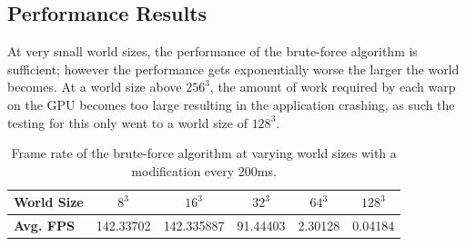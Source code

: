 \subsection{Performance Results}
At very small world sizes, the performance of the brute-force algorithm is sufficient; however the performance gets
exponentially worse the larger the world becomes. At a world size above \(256^3\), the amount of work required by each
warp on the GPU becomes too large resulting in the application crashing, as such the testing for this only went to a
world size of \(128^3\).

\begin{table}[h]
    \centering
    \vspace{0.5em}
    \begin{tabular}{l|*{5}{c}}
        \toprule
        \textbf{World Size} & \textbf{\(8^3\)} & \textbf{\(16^3\)} & \textbf{\(32^3\)} & \textbf{\(64^3\)} & \textbf{\(128^3\)} \\
        \midrule
        \textbf{Avg. FPS}   & 142.33702        & 142.335887        & 91.44403          & 2.30128           & 0.04184            \\
        \bottomrule
    \end{tabular}
    \caption{Frame rate of the brute-force algorithm at varying world sizes with a modification every 200ms.}
    \label{tab:brute_force_fps}
\end{table}

\begin{table}[h]
    \centering
    \vspace{0.5em}
    \caption{Distance field compute shader execution time using the brute-force algorithm.}
    \label{tab:brute_force}
\end{table}

